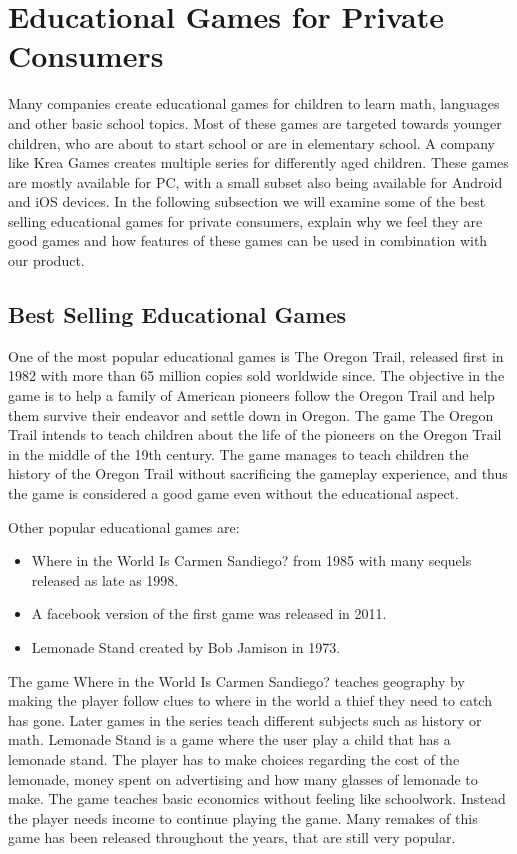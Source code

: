 \section{Educational Games for Private Consumers}
\label{sec:privateconsumers}
Many companies create educational games for children to learn math, languages and other basic school topics.
Most of these games are targeted towards younger children, who are about to start school or are in elementary school.
A company like Krea Games \cite{kreagames} creates multiple series for differently aged children.
These games are mostly available for PC, with a small subset also being available for Android and iOS devices.
In the following subsection we will examine some of the best selling educational games for private consumers, explain why we feel they are good games and how features of these games can be used in combination with our product.

\subsection{Best Selling Educational Games}
One of the most popular educational games is The Oregon Trail, released first in 1982 with more than 65 million copies sold worldwide since.\cite{oregontrail}
The objective in the game is to help a family of American pioneers follow the Oregon Trail and help them survive their endeavor and settle down in Oregon.
The game The Oregon Trail intends to teach children about the life of the pioneers on the Oregon Trail in the middle of the 19th century.
The game manages to teach children the history of the Oregon Trail without sacrificing the gameplay experience, and thus the game is considered a good game even without the educational aspect.\newline

Other popular educational games are:
\begin{itemize}
	\item Where in the World Is Carmen Sandiego? from 1985 with many sequels released as late as 1998.\cite{carmensandiego}
	\item A facebook version of the first game was released in 2011.
	\item Lemonade Stand created by Bob Jamison in 1973.\cite{lemonadestand}
\end{itemize}

The game Where in the World Is Carmen Sandiego? teaches geography by making the player follow clues to where in the world a thief they need to catch has gone.
Later games in the series teach different subjects such as history or math.
Lemonade Stand is a game where the user play a child that has a lemonade stand.
The player has to make choices regarding the cost of the lemonade, money spent on advertising and how many glasses of lemonade to make.
The game teaches basic economics without feeling like schoolwork. Instead the player needs income to continue playing the game.
Many remakes of this game has been released throughout the years, that are still very popular.

